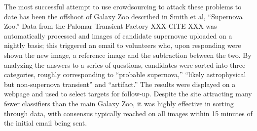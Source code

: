 \documentclass{ar2e}
\begin{document}
The most successful attempt to use crowdsourcing to attack these problems to
date has been the offshoot of Galaxy Zoo described in Smith et al, ``Supernova
Zoo.'' Data from the Palomar Transient Factory XXX CITE XXX was automatically
processed and images of candidate supernovae uploaded on a nightly basis; this
triggered an email to volunteers who, upon responding were shown the new image,
a reference image and the subtraction between the two. By analyzing the answers
to a series of questions, candidates were sorted into three categories, roughly
corresponding to ``probable supernova,'' ``likely astrophysical but
non-supernova transient'' and ``artifact.'' The results were displayed on a
webpage and used to select targets for follow-up. Despite the site attracting
many fewer classifiers than the main Galaxy Zoo, it was highly effective in
sorting through data, with consensus typically reached on all images within 15
minutes of the initial email being sent. 



\end{document}
